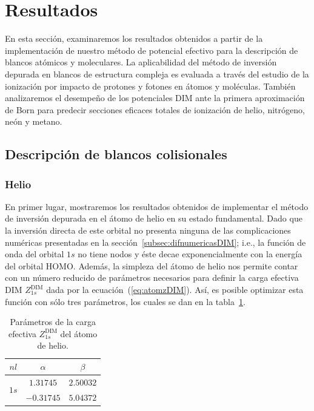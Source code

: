 \section{Resultados}

En esta sección, examinaremos los resultados obtenidos a partir de la 
implementación de nuestro método de potencial efectivo para la descripción 
de blancos atómicos y moleculares. 
La aplicabilidad del método de inversión depurada en blancos de 
estructura compleja es evaluada a través del estudio de la ionización 
por impacto de protones y fotones en átomos y moléculas. También 
analizaremos el desempeño de los potenciales DIM ante la primera 
aproximación de Born para predecir secciones eficaces totales de 
ionización de helio, nitrógeno, neón y metano.

\subsection{Descripción de blancos colisionales}
\subsubsection{Helio}

En primer lugar, mostraremos los resultados obtenidos de implementar
el método de inversión depurada en el átomo de helio en su estado
fundamental. Dado que la inversión directa de este orbital no presenta 
ninguna de las complicaciones numéricas presentadas en la
sección~\ref{subsec:difnumericasDIM}; i.e., la función de onda del 
orbital $1s$ no tiene nodos y éste decae exponencialmente con la energía 
del orbital HOMO. Además, la simpleza del átomo de helio nos permite contar 
con un número reducido de parámetros necesarios para definir la carga 
efectiva DIM $Z_{1s}^{\mathrm{ DIM}}$ dada por la 
ecuación~(\ref{eq:atomzDIM}). Así, es posible optimizar esta función 
con sólo tres parámetros, los cuales se dan en la tabla~\ref{tab:parametrosHe}.

\begin{table}
\begin{center}
\begin{tabular}{|c|c|c|}
\hline
  $nl$ & $\alpha$ & $\beta$ \\
\hline
\hline
\multirow{2}{*}{$1s$} &  $1.31745$ & $2.50032$ \\
                      & $-0.31745$ & $5.04372$ \\
\hline
\end{tabular}
\caption[Parámetros de la carga efectiva del helio.]
{Parámetros de la carga efectiva $Z_{1s}^{\mathrm{ DIM}}$ del átomo de 
helio.}
\label{tab:parametrosHe}
\end{center}
\end{table}

